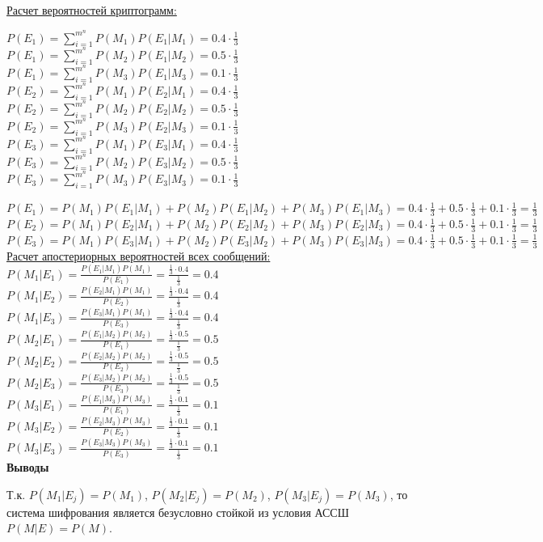 \documentclass[a4paper,14pt]{extarticle}
\begin{document}
    \underline{Расчет вероятностей криптограмм:}
    \begin{multicols}{2}
    \noindent$P(E_1)=\sum\limits_{i=1}^{m^n} P(M_1)P(E_1|M_1) = 0.4\cdot\frac{1}{3}$\\
    $P(E_1)=\sum\limits_{i=1}^{m^n} P(M_2)P(E_1|M_2) = 0.5\cdot\frac{1}{3}$\\
    $P(E_1)=\sum\limits_{i=1}^{m^n} P(M_3)P(E_1|M_3) = 0.1\cdot\frac{1}{3}$\\
    $P(E_2)=\sum\limits_{i=1}^{m^n} P(M_1)P(E_2|M_1) = 0.4\cdot\frac{1}{3}$\\
    $P(E_2)=\sum\limits_{i=1}^{m^n} P(M_2)P(E_2|M_2) = 0.5\cdot\frac{1}{3}$\\
    $P(E_2)=\sum\limits_{i=1}^{m^n} P(M_3)P(E_2|M_3) = 0.1\cdot\frac{1}{3}$\\
    $P(E_3)=\sum\limits_{i=1}^{m^n} P(M_1)P(E_3|M_1) = 0.4\cdot\frac{1}{3}$\\
    $P(E_3)=\sum\limits_{i=1}^{m^n} P(M_2)P(E_3|M_2) = 0.5\cdot\frac{1}{3}$\\
    $P(E_3)=\sum\limits_{i=1}^{m^n} P(M_3)P(E_3|M_3) = 0.1\cdot\frac{1}{3}$\\
    \end{multicols}
    \noindent$P(E_1)=P(M_1)P(E_1|M_1)+P(M_2)P(E_1|M_2)+P(M_3)P(E_1|M_3)=0.4\cdot\frac{1}{3}+0.5\cdot\frac{1}{3}+0.1\cdot\frac{1}{3}=\frac{1}{3}$\\
    $P(E_2)=P(M_1)P(E_2|M_1)+P(M_2)P(E_2|M_2)+P(M_3)P(E_2|M_3)=0.4\cdot\frac{1}{3}+0.5\cdot\frac{1}{3}+0.1\cdot\frac{1}{3}=\frac{1}{3}$\\
    $P(E_3)=P(M_1)P(E_3|M_1)+P(M_2)P(E_3|M_2)+P(M_3)P(E_3|M_3)=0.4\cdot\frac{1}{3}+0.5\cdot\frac{1}{3}+0.1\cdot\frac{1}{3}=\frac{1}{3}$\\

    \underline{Расчет апостериорных вероятностей всех сообщений:}\\
    \noindent$P(M_1|E_1)=\frac{P(E_1|M_1)P(M_1)}{P(E_1)}=\frac{\frac{1}{3}\cdot0.4}{\frac{1}{3}}=0.4$\\
    $P(M_1|E_2)=\frac{P(E_2|M_1)P(M_1)}{P(E_2)}=\frac{\frac{1}{3}\cdot0.4}{\frac{1}{3}}=0.4$\\
    $P(M_1|E_3)=\frac{P(E_3|M_1)P(M_1)}{P(E_3)}=\frac{\frac{1}{3}\cdot0.4}{\frac{1}{3}}=0.4$\\
    $P(M_2|E_1)=\frac{P(E_1|M_2)P(M_2)}{P(E_1)}=\frac{\frac{1}{3}\cdot0.5}{\frac{1}{3}}=0.5$\\
    $P(M_2|E_2)=\frac{P(E_2|M_2)P(M_2)}{P(E_2)}=\frac{\frac{1}{3}\cdot0.5}{\frac{1}{3}}=0.5$\\
    $P(M_2|E_3)=\frac{P(E_3|M_2)P(M_2)}{P(E_3)}=\frac{\frac{1}{3}\cdot0.5}{\frac{1}{3}}=0.5$\\
    $P(M_3|E_1)=\frac{P(E_1|M_3)P(M_3)}{P(E_1)}=\frac{\frac{1}{3}\cdot0.1}{\frac{1}{3}}=0.1$\\
    $P(M_3|E_2)=\frac{P(E_2|M_3)P(M_3)}{P(E_2)}=\frac{\frac{1}{3}\cdot0.1}{\frac{1}{3}}=0.1$\\
    $P(M_3|E_3)=\frac{P(E_3|M_3)P(M_3)}{P(E_3)}=\frac{\frac{1}{3}\cdot0.1}{\frac{1}{3}}=0.1$\\
    \textbf{Выводы}

    Т.к. $P(M_1|E_j)=P(M_1)$, $P(M_2|E_j)=P(M_2)$, $P(M_3|E_j)=P(M_3)$, то система шифрования 
    является безусловно стойкой из условия АССШ $P(M|E) = P(M)$.
\end{document}
